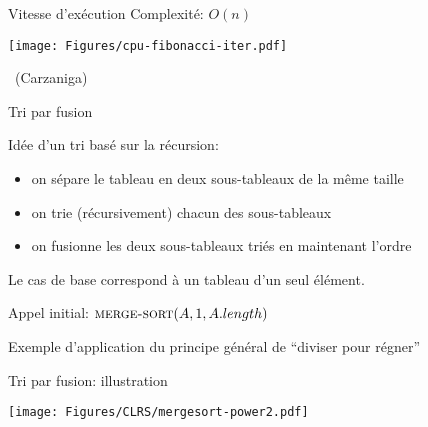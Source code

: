 \begin{frame}{Vitesse d'exécution}
Complexité: $O(n)$

\bigskip

\centerline{\texttt{[image: Figures/cpu-fibonacci-iter.pdf]}}
~\hfill\scriptsize(Carzaniga)
\end{frame}

\begin{frame}{Tri par fusion}

Idée d'un tri basé sur la récursion:
\begin{itemize}
\item on sépare le tableau en deux sous-tableaux de la même taille
\item on trie (récursivement) chacun des sous-tableaux
\item on fusionne les deux sous-tableaux triés en maintenant l'ordre
\end{itemize}
Le cas de base correspond à un tableau d'un seul élément.

\bigskip

\begin{center}
\end{center}

\centerline{Appel initial: $\textnormal{\scshape merge-sort}(A,1,A.length)$}

\bigskip

Exemple d'application du principe général de ``\alert{diviser pour régner}''


\end{frame}

\begin{frame}{Tri par fusion: illustration}

\centerline{\texttt{[image: Figures/CLRS/mergesort-power2.pdf]}}


\end{frame}

